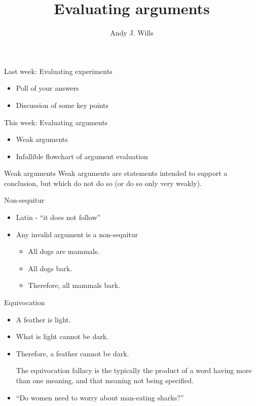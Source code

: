 \documentclass{beamer}
\title[Critical Thinking]{Evaluating arguments}
\author{Andy J. Wills}
\date{}
\begin{document}
\frame{\titlepage}

\begin{frame}{Last week: Evaluating experiments}
  \begin{itemize}
  \item Poll of your answers
  \item Discussion of some key points
  \end{itemize}
\end{frame}

\begin{frame}{This week: Evaluating arguments}
  \begin{itemize}
  \item Weak arguments
  \item Infallible flowchart of argument evaluation
  \end{itemize}
\end{frame}

\begin{frame}{Weak arguments}
Weak arguments are statements intended to support a conclusion, but which do not do so (or do so only very weakly). 
\end{frame}

\begin{frame}{Non-sequitur}
\begin{itemize}
\item Latin - ``it does not follow''
\item Any invalid argument is a non-sequitur
\begin{itemize}
	\item All dogs are mammals.
	\item All dogs bark.
	\item Therefore, all mammals bark.
\end{itemize}
\end{itemize}
\end{frame}

\begin{frame}{Equivocation}
\begin{itemize}
\item A feather is light.
\item What is light cannot be dark.
\item Therefore, a feather cannot be dark.

The equivocation fallacy is the typically the product of a word having more than one meaning, and that meaning not being specified. 

\item ``Do women need to worry about man-eating sharks?''
\end{itemize}
\end{frame}
\end{document}
